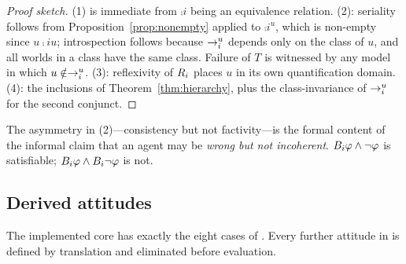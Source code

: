 \documentclass[11pt,a4paper]{article}
\begin{document}
\begin{proof}[Proof sketch]
(1) is immediate from $\comp{i}$ being an equivalence relation. (2): seriality follows from
Proposition~\ref{prop:nonempty} applied to $\comp{i}^{u}$, which is non-empty since $u \comp{i} u$;
introspection follows because $\rightarrow_{i}^{u}$ depends only on the class of $u$, and all worlds
in a class have the same class. Failure of $T$ is witnessed by any model in which $u \notin
\rightarrow_{i}^{u}$. (3): reflexivity of $R_{i}$ places $u$ in its own quantification domain.
(4): the inclusions of Theorem~\ref{thm:hierarchy}, plus the class-invariance of $\rightarrow_{i}^{u}$ for
the second conjunct.
\end{proof}

\begin{remark}
The asymmetry in (2)---consistency but not factivity---is the formal content of the informal
claim that an agent may be \emph{wrong but not incoherent}. $B_{i}\varphi \wedge \neg\varphi$
is satisfiable; $B_{i}\varphi \wedge B_{i}\neg\varphi$ is not.
\end{remark}

\subsection{Derived attitudes}
\label{sec:sugar}

The implemented core has exactly the eight cases of . Every further attitude
in  is defined by translation and eliminated before evaluation.
\end{document}
